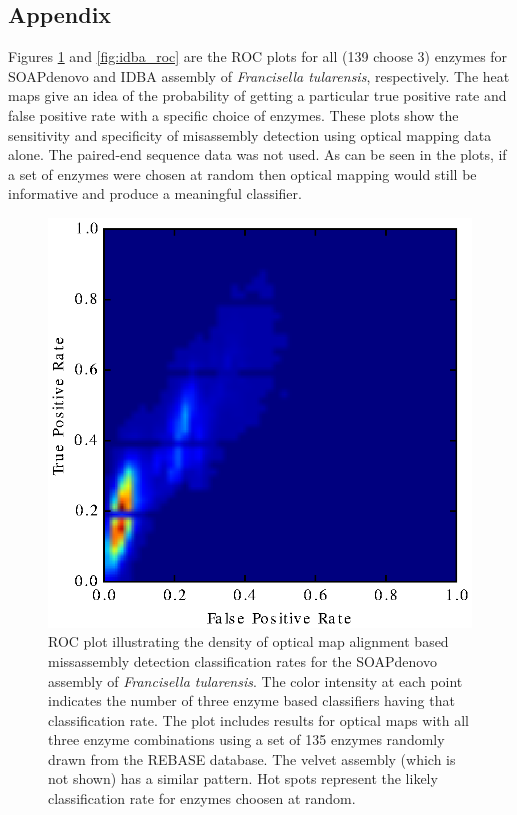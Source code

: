 \documentclass[doctor]{thesis}
\begin{document}
 
\makeatletter{}\subsection{Appendix}

Figures \ref{fig:soap_roc} and \ref{fig:idba_roc} are the ROC plots for all (139 choose 3) enzymes for SOAPdenovo and IDBA assembly of {\em Francisella tularensis}, respectively.  The heat maps give an idea of the probability of getting a particular true positive rate and false positive rate with a specific choice of enzymes.  These plots show the sensitivity and specificity of misassembly detection using optical mapping data alone.  The paired-end sequence data was not used.  As can be seen in the plots, if a set of enzymes were chosen at random then optical mapping would still be informative and produce a meaningful classifier.  

        \begin{figure}[h!]
            \centering
              	\includegraphics[scale=.9]{recomb15mis/soap.eps}
                	\caption{ROC plot illustrating the density of optical map alignment based missassembly detection classification rates for the SOAPdenovo assembly of {\em Francisella tularensis}. The color intensity at each point indicates the number of three enzyme based classifiers having that classification rate. The plot includes results for optical maps with all three enzyme combinations using a set of 135 enzymes randomly drawn from the REBASE database.  The velvet assembly (which is not shown) has a similar pattern.  Hot spots represent the likely classification rate for enzymes choosen at random.}
                	\label{fig:soap_roc}
        \end{figure}
\end{document}
